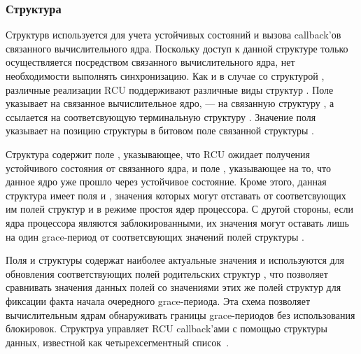\subsubsection{Структура } \label{sec:rcu_data}
Структурв  используется для учета устойчивых состояний и
вызова callback'ов связанного вычислительного ядра.
Поскольку доступ к данной структуре только осуществляется посредством
связанного вычислительного ядра, нет необходимости выполнять синхронизацию.
Как и в случае со структурой , различные реализации RCU поддерживают
различные виды структур .
Поле  указывает на связанное вычислительное ядро,
 --- на связанную структуру ,
а  ссылается на соответсвующую терминальную структуру .
Значение поля  указывает на позицию структуры 
в битовом поле  связанной структуры .

Структура  содержит поле , указывающее,
что RCU ожидает получения устойчивого состояния от связанного ядра,
и поле , указывающее на то, что данное ядро уже
прошло через устойчивое состояние.
Кроме этого, данная структура имеет поля  и ,
значения которых могут отставать от соответсвующих им полей структур
 и  в режиме простоя ядер процессора.
С другой стороны, если ядра процессора являются заблокированными,
их значения могут оставать лишь на один grace-период от соответсвующих значений
полей структуры .

Поля  и  структуры  содержат наиболее
актуальные значения и используются для обновления соответствующих полей родительских
структур , что позволяет сравнивать значения данных полей со значениями
этих же полей структур  для фиксации факта начала очередного grace-периода.
Эта схема позволяет вычислительным ядрам обнаруживать границы grace-периодов
без использования блокировок.
Структруа  управляет RCU callback'ами с помощью
структуры данных, известной как четырехсегментный
список~\cite{LaiJiangshan2008NewClassicAlgorithm}.


